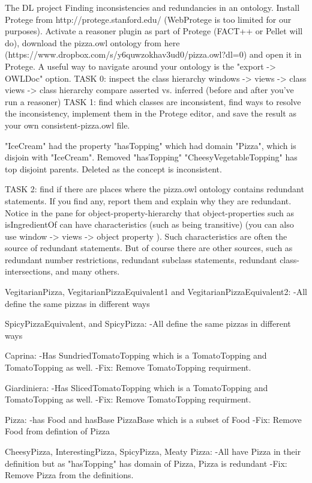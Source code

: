 The DL project
Finding inconsistencies and redundancies in an ontology.
Install Protege from http://protege.stanford.edu/ (WebProtege is too limited for our purposes). Activate a reasoner plugin as part of Protege (FACT++ or Pellet will do), download the pizza.owl ontology from here (https://www.dropbox.com/s/y6quwzokhav3ud0/pizza.owl?dl=0) and open it in Protege. A useful way to navigate around your ontology is the "export -> OWLDoc" option.
TASK 0: inspect the class hierarchy windows -> views -> class views -> class hierarchy compare asserted vs. inferred (before and after you've run a reasoner)
TASK 1: find which classes are inconsistent, find ways to resolve the inconsistency, implement them in the Protege editor, and save the result as your own consistent-pizza.owl file.

"IceCream" had the property "hasTopping" which had domain "Pizza", which is disjoin with "IceCream". Removed "hasTopping"
"CheesyVegetableTopping" has top disjoint parents. Deleted as the concept is inconsistent.

TASK 2: find if there are places where the pizza.owl ontology contains redundant statements. If you find any, report them and explain why they are redundant. Notice in the pane for object-property-hierarchy that object-properties such as isIngredientOf can have characteristics (such as being transitive) (you can also use window -> views -> object property ). Such characteristics are often the source of redundant statements. But of course there are other sources, such as redundant number restrictions, redundant subclass statements, redundant class-intersections, and many others.

VegitarianPizza, VegitarianPizzaEquivalent1 and VegitarianPizzaEquivalent2:
-All define the same pizzas in different ways

SpicyPizzaEquivalent, and SpicyPizza:
-All define the same pizzas in different ways

Caprina:
-Has SundriedTomatoTopping which is a TomatoTopping and TomatoTopping as well.
-Fix:
  Remove TomatoTopping requirment.

Giardiniera:
-Has SlicedTomatoTopping which is a TomatoTopping and TomatoTopping as well.
-Fix:
  Remove TomatoTopping requirment.

Pizza:
-has Food and hasBase PizzaBase which is a subset of Food
-Fix:
  Remove Food from defintion of Pizza

CheesyPizza, InterestingPizza, SpicyPizza, Meaty Pizza:
-All have Pizza in their definition but as "hasTopping" has domain of Pizza, Pizza is redundant
-Fix:
  Remove Pizza from the definitions.


